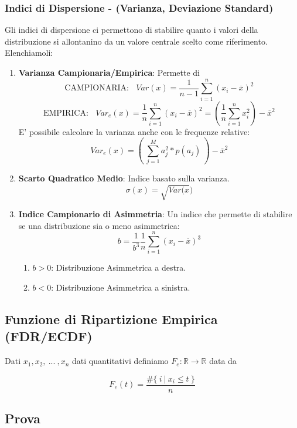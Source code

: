 \documentclass{article}
\begin{document}
\newpage

\subsubsection{Indici di Dispersione - (Varianza, Deviazione Standard)}

Gli indici di dispersione ci permettono di stabilire quanto i valori della distribuzione si allontanino da un valore centrale scelto come riferimento.
Elenchiamoli:

\begin{enumerate}
    \item \textbf{Varianza Campionaria/Empirica}: Permette di 
    \[ \text{CAMPIONARIA:} \:\:\:\: Var(x) = \frac{1}{n-1} \sum^{n}_{i=1}(x_{i}-\overline{x})^{2} \]
    \[ \text{EMPIRICA:} \:\:\:\: Var_{e}(x) = \frac{1}{n} \sum^{n}_{i=1}(x_{i}-\overline{x})^{2} = (\frac{1}{n}\sum^{n}_{i=1}x^{2}_{i}) - \overline{x}^{2}\]
    \vspace*{5px}
    E' possibile calcolare la varianza anche con le frequenze relative:
    \[ Var_{e}(x) = (\:\sum_{j=1}^{M}a^{2}_{j} * p(a_{j})\:) - \overline{x}^{2}\]
    \item \textbf{Scarto Quadratico Medio}: Indice basato sulla varianza.
    \[ \sigma(x) = \sqrt{Var(x}) \]
    \item \textbf{Indice Campionario di Asimmetria}: Un indice che permette di stabilire se una distribuzione sia o meno asimmetrica:
    \[ b = \frac{1}{b^{3}}\frac{1}{n}\sum_{i=1}^{n}(x_{i}-\overline{x})^{3} \]
    \begin{enumerate}
        \item $b>0$: Distribuzione Asimmetrica a destra.
        \item $b<0$: Distribuzione Asimmetrica a sinistra.
    \end{enumerate}
\end{enumerate}

\subsection{Funzione di Ripartizione Empirica (FDR/ECDF)}

Dati $x_{1}, x_{2}, \: ... \:, x_{n}$ dati quantitativi definiamo $F_{e}:\mathbb{R} \xrightarrow{} \mathbb{R}$ data da

\vspace*{10px}

\[ \boxed{F_{e}(t) = \frac{\#\{ \: i \: | \:x_{i} \leq t \: \}}{n}} \]

\subsection{Prova}

\newpage
\end{document}
